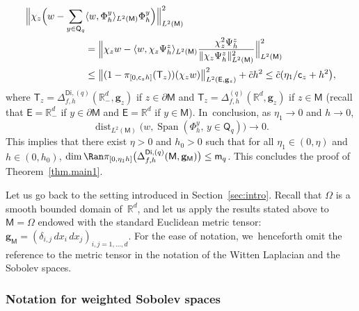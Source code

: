 \documentclass[JEP,XML,SOM,Unicode,NoEqCountersInSection,NoFloatCountersInSection,published]{cedram}
\DeclareMathOperator{\dist}{dist}
\DeclareMathOperator{\Span}{Span}
\newcommand{\mbf}[1]{\mathbf{#1}}
\let\lp\langle
\let\rp\rangle
\let\pa\partial
\theoremstyle{plain}
\theoremstyle{definition}
\begin{document}
\begin{align*}
\Big \Vert \chi_z\Bigl(w- \sum_{y \in \mathsf Q_q}& \lp w, \Phi_h^y\rp _{L^2(\mathsf M)} \Phi_h^y\Bigr) \Big \Vert_{L^2(\mathsf M)}^2 \\ &= \Big \Vert \chi_z w - \lp w, \chi_z \Psi_h^z\rp _{L^2(\mathsf M)} \frac{\chi_z^2 \Psi_h^z }{ \Vert \chi_z\Psi_h^z \Vert_{L^2(\mathsf M)}^2}\Big \Vert_{L^2(\mathsf M)}^2 \\
&\le \big \Vert (1-\pi_{[0,\mathsf c_zh]} (\mathsf T_z))(\chi_z w)\big \Vert_{L^2(\mathsf E,\mbf g_z)}^2 + \tilde{c} h^2\le \tilde{c}(\eta_1/\mathsf c_z +h^2 \bigr),
\end{align*}
where $\mathsf T_z=\Delta_{f,h}^{\mathsf{Di},(q)}(\mathbb R^d_-,\mbf g_z)$ if $z\in \pa \mathsf M$ and $\mathsf T_z=\Delta_{f,h}^{(q)}(\mathbb R^d,\mbf g_z)$ if $z\in \mathsf M$ (recall that $\mathsf E=\mathbb R^d_-$ if $y\in \pa \mathsf M$ and $\mathsf E=\mathbb R^d$ if $ y\in \mathsf M$). In~conclusion, as $\eta_1\to 0$ and $h\to 0$,
\[
\dist_{L^2(\mathsf M)}\bigl(w, \Span (\Phi_h^y, \, y\in \mathsf Q_q) \bigr)\to 0.
\]
This implies that there exist $\eta>0$ and $h_0>0$ such that for all $\eta_1\in (0,\eta)$ and $h\in (0,h_0)$, $\dim \Ran \pi_{[0,\eta_1h]}\bigl(\Delta_{f,h}^{\mathsf{Di},(q)}(\mathsf M,\mbf g_{\mathsf M})\bigr)\le \mathsf m_q$. This concludes the proof of Theorem~\ref{thm.main1}.

\label{sec.seclienwitten}
Let us go back to the setting introduced in Section~\ref{sec:intro}.
Recall that $\Omega$ is a smooth bounded domain of~$\mathbb R^d$,
and let us apply the results stated above to $\mathsf M=\Omega$
endowed with the standard Euclidean metric tensor: $\mbf
g_{\mathsf M} =(\delta_{i,j} \, dx_i \, dx_j)_{i,j=1,\ldots,d}$. For
the ease of notation, we~henceforth omit the reference to the metric tensor in the notation of the Witten Laplacian and the Sobolev spaces.

\subsubsection{Notation for weighted Sobolev spaces}
\label{sec.not-Sw}
\end{document}
